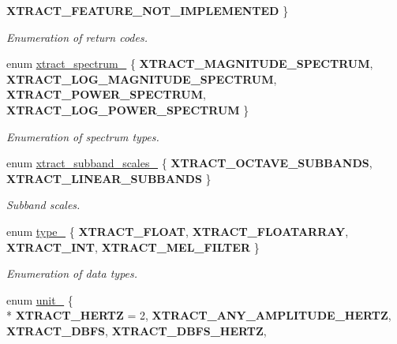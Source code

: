 \begin{DoxyCompactItemize}
{\bfseries X\-T\-R\-A\-C\-T\-\_\-\-F\-E\-A\-T\-U\-R\-E\-\_\-\-N\-O\-T\-\_\-\-I\-M\-P\-L\-E\-M\-E\-N\-T\-E\-D}
 \}
\begin{DoxyCompactList}\small\item\em Enumeration of return codes. \end{DoxyCompactList}\item 
enum \hyperlink{group__libxtract_ga8250821146e9b189de264204869e6215}{xtract\-\_\-spectrum\-\_\-} \{ {\bfseries X\-T\-R\-A\-C\-T\-\_\-\-M\-A\-G\-N\-I\-T\-U\-D\-E\-\_\-\-S\-P\-E\-C\-T\-R\-U\-M}, 
{\bfseries X\-T\-R\-A\-C\-T\-\_\-\-L\-O\-G\-\_\-\-M\-A\-G\-N\-I\-T\-U\-D\-E\-\_\-\-S\-P\-E\-C\-T\-R\-U\-M}, 
{\bfseries X\-T\-R\-A\-C\-T\-\_\-\-P\-O\-W\-E\-R\-\_\-\-S\-P\-E\-C\-T\-R\-U\-M}, 
{\bfseries X\-T\-R\-A\-C\-T\-\_\-\-L\-O\-G\-\_\-\-P\-O\-W\-E\-R\-\_\-\-S\-P\-E\-C\-T\-R\-U\-M}
 \}
\begin{DoxyCompactList}\small\item\em Enumeration of spectrum types. \end{DoxyCompactList}\item 
enum \hyperlink{group__libxtract_ga82e20836eb8b4f1222259b6dfa95982b}{xtract\-\_\-subband\-\_\-scales\-\_\-} \{ {\bfseries X\-T\-R\-A\-C\-T\-\_\-\-O\-C\-T\-A\-V\-E\-\_\-\-S\-U\-B\-B\-A\-N\-D\-S}, 
{\bfseries X\-T\-R\-A\-C\-T\-\_\-\-L\-I\-N\-E\-A\-R\-\_\-\-S\-U\-B\-B\-A\-N\-D\-S}
 \}
\begin{DoxyCompactList}\small\item\em Subband scales. \end{DoxyCompactList}\item 
enum \hyperlink{group__libxtract_ga25b1a5e607667037564acfa9f740d2c8}{type\-\_\-} \{ {\bfseries X\-T\-R\-A\-C\-T\-\_\-\-F\-L\-O\-A\-T}, 
{\bfseries X\-T\-R\-A\-C\-T\-\_\-\-F\-L\-O\-A\-T\-A\-R\-R\-A\-Y}, 
{\bfseries X\-T\-R\-A\-C\-T\-\_\-\-I\-N\-T}, 
{\bfseries X\-T\-R\-A\-C\-T\-\_\-\-M\-E\-L\-\_\-\-F\-I\-L\-T\-E\-R}
 \}
\begin{DoxyCompactList}\small\item\em Enumeration of data types. \end{DoxyCompactList}\item 
enum \hyperlink{group__libxtract_gab71f92446509ed7f46d35cdb256ee036}{unit\-\_\-} \{ \\*
{\bfseries X\-T\-R\-A\-C\-T\-\_\-\-H\-E\-R\-T\-Z} = 2, 
{\bfseries X\-T\-R\-A\-C\-T\-\_\-\-A\-N\-Y\-\_\-\-A\-M\-P\-L\-I\-T\-U\-D\-E\-\_\-\-H\-E\-R\-T\-Z}, 
{\bfseries X\-T\-R\-A\-C\-T\-\_\-\-D\-B\-F\-S}, 
{\bfseries X\-T\-R\-A\-C\-T\-\_\-\-D\-B\-F\-S\-\_\-\-H\-E\-R\-T\-Z}, 

\end{DoxyCompactItemize}
